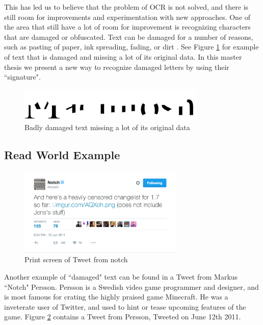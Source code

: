This has led us to believe that the problem of OCR is not solved, and there is still room for improvements and experimentation with new approaches. One of the area that still have a lot of room for improvement is recognizing characters that are damaged or obfuscated. Text can be damaged for a number of reasons, such as pasting of paper, ink spreading, fading, or dirt \citep{bhardwaj2014imaging}. See Figure \ref{fig:damaged-text} for example of text that is damaged and missing a lot of its original data. In this master thesis we present a new way to recognize damaged letters by using their ``signature".

\begin{figure}[ht]
    \centering
    \includegraphics[width=0.8\textwidth]{fig/chapter1/damaged.png}
    \caption{Badly damaged text missing a lot of its original data}
    \label{fig:damaged-text}
\end{figure}

\subsection{Read World Example}
\begin{figure}[ht]
    \centering
    \includegraphics[width=0.7\textwidth]{fig/chapter1/notch_tweet.png}
    \caption[Print screen of Tweet from notch]{Print screen of Tweet from notch}
    \label{ref:notch_twitter}
\end{figure}

Another example of ``damaged" text can be found in a Tweet from Markus ``Notch" Persson. Persson is a Swedish video game programmer and designer, and is most famous for crating the highly praised game Minecraft. He was a inveterate user of Twitter, and used to hint or tease upcoming features of the game. Figure \ref{ref:notch_twitter} contains a Tweet from Persson, Tweeted on June 12th 2011.

